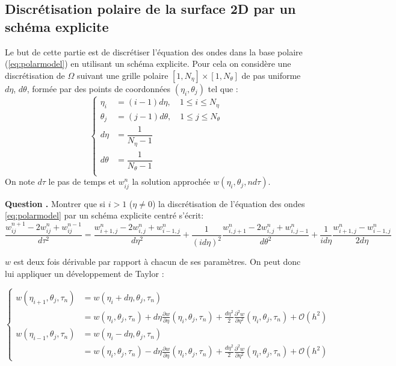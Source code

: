 \documentclass[a4,12pt]{article}
\newcounter{Nbquestion}
\newcommand*\question{%
\stepcounter{Nbquestion}%
\textbf{Question \theNbquestion. }}
\begin{document}
\subsection{Discrétisation polaire de la surface 2D par un schéma explicite }
Le but de cette partie est de discrétiser l'équation des ondes dans la base polaire (\ref{eq:polarmodel}) en utilisant un schéma explicite. Pour cela on considère une discrétisation de $\Omega $ suivant une grille polaire $[1,N_\eta]\times [1,N_\theta]$ de pas uniforme $d\eta$, $d\theta$, formée par des points de coordonnées $(\eta_i,\theta_j)$ tel que :
\begin{equation*}{}
	\left\{
	\begin{array}{rl}
		\eta_i &=(i-1) d\eta,\quad 1\leq i \leq N_\eta \\
		\theta_j &=(j-1) d \theta,\quad  1\leq j \leq N_\theta \\
 		d\eta& =\dfrac{1}{N_\eta-1}\\
		 d\theta &=\dfrac{1}{N_{\theta}-1}\\
	\end{array}
	\right.
\end{equation*}
On note $d\tau$ le pas de temps et $w_{ij}^{n}$ la solution approchée $w(\eta_i,\theta_j,nd\tau)$. 


\begin{mdframed}[style=exampledefault]
\question Montrer que si $i>1$ ($\eta \neq 0$) la discrétisation de l'équation des ondes \ref{eq:polarmodel} par un schéma explicite centré s'écrit:
\footnotesize{
\begin{equation} 
	\frac{w_{ij}^{n+1}-2w_{ij}^{n}+w_{ij}^{n-1}}{d\tau^{2}}=\frac{w_{i+1,j}^{n}-2w_{i,j}^{n}+w_{i-1,j}^{n}}{d\eta^{2}}+\frac{1}{(i d\eta)^2} \frac{w_{i,j+1}^{n}-2w_{i,j}^{n}+w_{i,j-1}^{n}}{d\theta^{2}}+\frac{1}{id\eta}\frac{w_{i+1,j}^{n}-w_{i-1,j}^{n}}{2d\eta}
	\label{dispol}
\end{equation}
}
\end{mdframed}

$w$ est deux fois dérivable par rapport à chacun de ses paramètres. On peut donc
lui appliquer un développement de Taylor :

$$
\left\{\begin{aligned}
  w(\eta_{i+1}, \theta_j, \tau_n) &= w(\eta_i + d\eta, \theta_j, \tau_n) \\
                                  &= w(\eta_i, \theta_j, \tau_n) + d\eta \frac{\partial w}{\partial \eta}(\eta_i, \theta_j, \tau_n) + \frac{d\eta^2}{2} \frac{\partial^2 w}{\partial \eta^2}(\eta_i, \theta_j, \tau_n) + \mathcal{O}(h^2) \\
  w(\eta_{i-1}, \theta_j, \tau_n) &= w(\eta_i - d\eta, \theta_j, \tau_n) \\
                                  &= w(\eta_i, \theta_j, \tau_n) - d\eta \frac{\partial w}{\partial \eta}(\eta_i, \theta_j, \tau_n) + \frac{d\eta^2}{2} \frac{\partial^2 w}{\partial \eta^2}(\eta_i, \theta_j, \tau_n) + \mathcal{O}(h^2)
\end{aligned}\right.
$$
\end{document}
